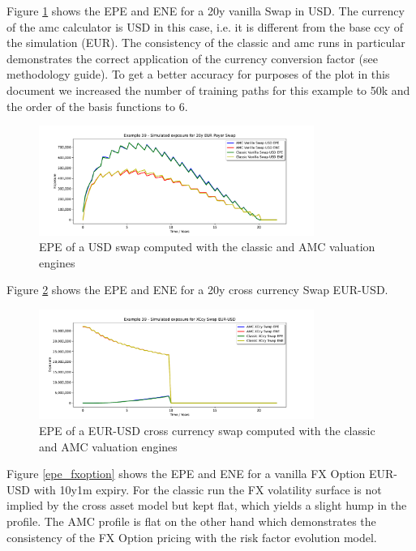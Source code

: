 Figure \ref{epe_swap} shows the EPE and ENE for a 20y vanilla Swap in USD. The currency of
the amc calculator is USD in this case, i.e. it is different from the base ccy of the simulation (EUR).
The consistency of the classic and amc runs in particular demonstrates the correct application of the currency
conversion factor (see methodology guide). To get a better accuracy for purposes of the plot in this document
we increased the number of training paths for this example to 50k and the order of the basis functions to 6.

\begin{figure}
  \includegraphics[width=0.8\textwidth]{examples/mpl_amc_vanillaswap_usd.pdf}
  \caption{EPE of a USD swap computed with the classic and AMC valuation engines}
  \label{epe_swap}
\end{figure}

Figure \ref{epe_ccyswap} shows the EPE and ENE for a 20y cross currency Swap EUR-USD. 

\begin{figure}
  \includegraphics[width=0.8\textwidth]{examples/mpl_amc_xccyswap.pdf}
  \caption{EPE of a EUR-USD cross currency swap computed with the classic and AMC valuation engines}
  \label{epe_ccyswap}
\end{figure}

Figure \ref{epe_fxoption} shows the EPE and ENE for a vanilla FX Option EUR-USD with 10y1m expiry. 
For the classic run the FX volatility surface is not implied by the cross asset model but kept flat, which
yields a slight hump in the profile. The AMC profile is flat on the other hand which demonstrates the
consistency of the FX Option pricing with the risk factor evolution model.

